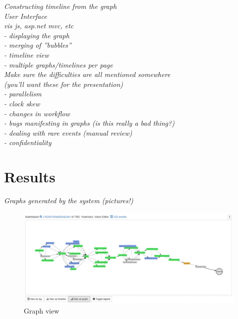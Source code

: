 \documentclass[english,12pt,a4paper,pdftex,sci,utf8]{aaltothesis}
\theoremstyle{definition}
\newcommand{\nyi}[1]{\noindent\colorbox{nyibg}{\textcolor{nyitext}{\emph{#1}}}}
\begin{document}
\nyi{Constructing timeline from the graph}\\

\nyi{User Interface}\\
\nyi{vis js, asp.net mvc, etc}\\
\nyi{ - displaying the graph}\\
\nyi{ - merging of ''bubbles''}\\
\nyi{ - timeline view}\\
\nyi{ - multiple graphs/timelines per page}\\

\nyi{Make sure the difficulties are all mentioned somewhere}\\
\nyi{(you'll want these for the presentation)}\\
\nyi{ - parallelism}\\
\nyi{ - clock skew}\\
\nyi{ - changes in workflow}\\
\nyi{ - bugs manifesting in graphs (is this really a bad thing?)}\\
\nyi{ - dealing with rare events (manual review)}\\
\nyi{ - confidentiality}\\



\clearpage
\section{Results}
\label{sec:results}


\nyi{Graphs generated by the system (pictures!)}


\begin{figure}[htb]
\centering \includegraphics[width=\linewidth]{gfx/graph.png}
\caption{Graph view \label{fig:graph}}
\end{figure}
\end{document}

